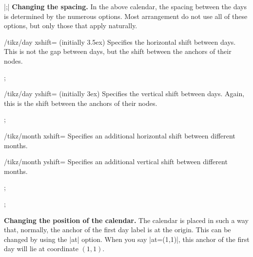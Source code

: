 \begin{command}{\calendar {}|;|}
  \medskip
  \textbf{Changing the spacing.}
  In the above calendar, the spacing between the days is determined by
  the numerous options. Most arrangement do not use all of these
  options, but only those that apply naturally.
  \begin{key}{/tikz/day xshift= (initially 3.5ex)}
    Specifies the
    horizontal shift between days. This is not the gap between days,
    but the shift between the anchors of their nodes.
\begin{codeexample}[]
\tikz \calendar[dates=2000-01-01 to 2000-01-31,week list,day xshift=3ex];
\end{codeexample}
  \end{key}
  \begin{key}{/tikz/day yshift= (initially 3ex)}
    Specifies the
    vertical shift between days. Again, this is the shift between the
    anchors of their nodes.
\begin{codeexample}[]
\tikz \calendar[dates=2000-01-01 to 2000-01-31,week list,day yshift=2ex];
\end{codeexample}
  \end{key}
  \begin{key}{/tikz/month xshift=}
    Specifies an additional  horizontal shift between different
    months.
  \end{key}
  \begin{key}{/tikz/month yshift=}
    Specifies an
    additional  vertical shift between different months.
\begin{codeexample}[]
\tikz \calendar[dates=2000-01-01 to 2000-02-last,week list,
                month yshift=0pt];
\end{codeexample}
\begin{codeexample}[]
\tikz \calendar[dates=2000-01-01 to 2000-02-last,week list,
                month yshift=1cm];
\end{codeexample}
  \end{key}

  \medskip
  \textbf{Changing the position of the calendar.}
  The calendar is placed in such a way that, normally, the anchor of
  the first day label is at the origin. This can be changed by using
  the |at| option. When you say |at={(1,1)}|, this anchor of the first
  day will lie at coordinate $(1,1)$.


\end{command}
